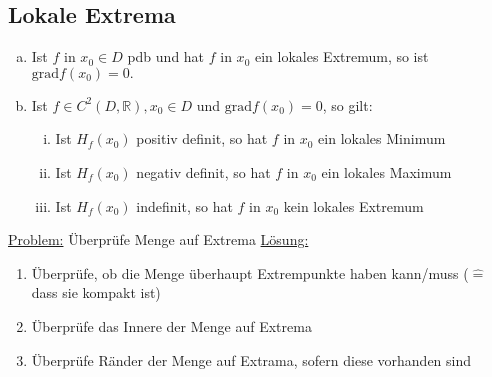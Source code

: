 \subsection{Lokale Extrema}
\begin{enumerate} [a)]
    \item Ist $f$ in $x_0 \in D$ pdb und hat $f$ in $x_0$ ein lokales Extremum, so ist $\text{grad}f(x_0) = 0.$
    \item Ist $f \in C^2(D,\mathbb{R}), x_0 \in D$ und $\text{grad}f(x_0) = 0$, so gilt:
    \begin{enumerate} [i)]
        \item Ist $H_f(x_0)$ positiv definit, so hat $f$ in $x_0$ ein lokales Minimum
        \item Ist $H_f(x_0)$ negativ definit, so hat $f$ in $x_0$ ein lokales Maximum
        \item Ist $H_f(x_0)$ indefinit, so hat $f$ in $x_0$ kein lokales Extremum
    \end{enumerate}
\end{enumerate}
\underline{Problem:} Überprüfe Menge auf Extrema
\underline{Lösung:} 
\begin{enumerate}
    \item Überprüfe, ob die Menge überhaupt Extrempunkte haben kann/muss ($\widehat{=}$ dass sie kompakt ist)
    \item Überprüfe das Innere der Menge auf Extrema
    \item Überprüfe Ränder der Menge auf Extrama, sofern diese vorhanden sind
\end{enumerate}
